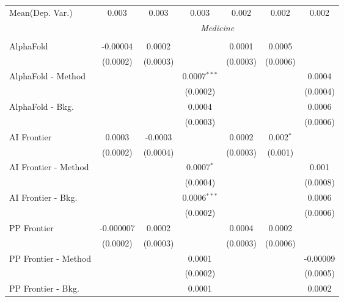 \begin{tabular}{lcccccc}
Mean(Dep. Var.) & 0.003 & 0.003 & 0.003 & 0.002 & 0.002 & 0.002 \\
 & \multicolumn{6}{c}{\textit{Medicine}} \\ \\
   AlphaFold            & -0.00004      & 0.0002   &                & 0.0001   & 0.0005      &   \\   
                        & (0.0002)      & (0.0003) &                & (0.0003) & (0.0006)    &   \\   
   AlphaFold - Method   &               &          & 0.0007$^{***}$ &          &             & 0.0004\\   
                        &               &          & (0.0002)       &          &             & (0.0004)\\   
   AlphaFold - Bkg.     &               &          & 0.0004         &          &             & 0.0006\\   
                        &               &          & (0.0003)       &          &             & (0.0006)\\   
   AI Frontier          & 0.0003        & -0.0003  &                & 0.0002   & 0.002$^{*}$ &   \\   
                        & (0.0002)      & (0.0004) &                & (0.0003) & (0.001)     &   \\   
   AI Frontier - Method &               &          & 0.0007$^{*}$   &          &             & 0.001\\   
                        &               &          & (0.0004)       &          &             & (0.0008)\\   
   AI Frontier - Bkg.   &               &          & 0.0006$^{***}$ &          &             & 0.0006\\   
                        &               &          & (0.0002)       &          &             & (0.0006)\\   
   PP Frontier          & -0.000007     & 0.0002   &                & 0.0004   & 0.0002      &   \\   
                        & (0.0002)      & (0.0003) &                & (0.0003) & (0.0006)    &   \\   
   PP Frontier - Method &               &          & 0.0001         &          &             & -0.00009\\   
                        &               &          & (0.0002)       &          &             & (0.0005)\\   
   PP Frontier - Bkg.   &               &          & 0.0001         &          &             & 0.0002\\   

\end{tabular}
